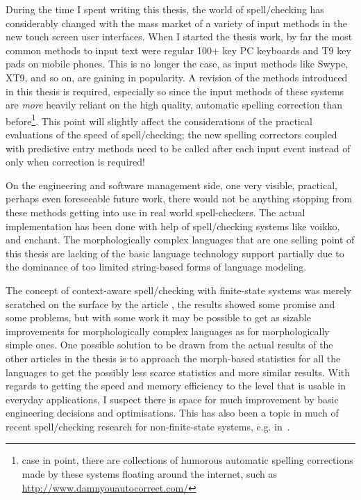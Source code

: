\documentclass[officiallayout]{unihelcompling}
\begin{document}
During the time I spent writing this thesis, the world of spell\-/checking has
considerably changed with the mass market of a variety of input methods in the
new touch screen user interfaces. When I started the thesis work, by far the
most common methods to input text were regular 100+ key PC keyboards and T9 key
pads on mobile phones. This is no longer the case, as input methods like Swype,
XT9, and so on, are gaining in popularity. A revision of the methods introduced
in this thesis is required, especially so since the input methods of these
systems are \emph{more} heavily reliant on the high quality, automatic spelling
correction than before\footnote{case in point, there are collections of
    humorous automatic spelling corrections made by these systems floating
around the internet, such as \url{http://www.damnyouautocorrect.com/}}. This
point will slightly affect the considerations of the practical evaluations of
the speed of spell\-/checking; the new spelling correctors coupled with
predictive entry methods need to be called after each input event instead of
only when correction is required!

On the engineering and software management side, one very visible, practical,
perhaps even foreseeable future work, there would not be anything stopping from
these methods getting into use in real world spell-checkers. The actual
implementation has been done with help of spell\-/checking systems like voikko,
and enchant. The morphologically complex languages that are one selling point
of this thesis are lacking of the basic language technology support partially
due to the dominance of too limited string-based forms of language modeling.

The concept of context-aware spell\-/checking with finite-state systems was
merely scratched on the surface by the article
, the results showed some promise and some
problems, but with some work it may be possible to get as sizable improvements
for morphologically complex languages as for morphologically simple ones. One
possible solution to be drawn from the actual results of the other articles in
the thesis is to approach the morph-based statistics for all the languages to
get the possibly less scarce statistics and more similar results. With regards
to getting the speed and memory efficiency to the level that is usable in
everyday applications, I suspect there is space for much improvement by basic
engineering decisions and optimisations. This has also been a topic in much of
recent spell\-/checking research for non-finite-state systems, e.g.
in~\citep{carlson2001scaling}.
\end{document}
